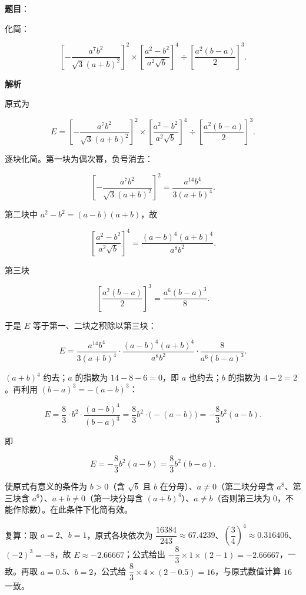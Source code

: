 \begin{answer}

\textbf{题目}：

化简：

\nopagebreak[4]
\[
\left[-\frac{a^7b^2}{\sqrt{3}(a+b)^2}\right]^2\times\left[\frac{a^2-b^2}{a^2\sqrt{b}}\right]^4\div\left[\frac{a^2(b-a)}{2}\right]^3.
\]

\textbf{解析}

原式为

\nopagebreak[4]
\[
E=\left[-\frac{a^7b^2}{\sqrt3(a+b)^2}\right]^2\times\left[\frac{a^2-b^2}{a^2\sqrt b}\right]^4\div\left[\frac{a^2(b-a)}{2}\right]^3.
\]

逐块化简。第一块为偶次幂，负号消去：

\nopagebreak[4]
\[
\left[-\frac{a^7b^2}{\sqrt3(a+b)^2}\right]^2=\frac{a^{14}b^4}{3(a+b)^4}.
\]

第二块中 $a^2-b^2=(a-b)(a+b)$，故

\nopagebreak[4]
\[
\left[\frac{a^2-b^2}{a^2\sqrt b}\right]^4
=\frac{(a-b)^4(a+b)^4}{a^8b^2}.
\]

第三块

\nopagebreak[4]
\[
\left[\frac{a^2(b-a)}{2}\right]^3=\frac{a^6(b-a)^3}{8}.
\]

于是 $E$ 等于第一、二块之积除以第三块：

\nopagebreak[4]
\[
E=\frac{a^{14}b^4}{3(a+b)^4}\cdot\frac{(a-b)^4(a+b)^4}{a^8b^2}\cdot\frac{8}{a^6(b-a)^3}.
\]

$(a+b)^4$ 约去；$a$ 的指数为 $14-8-6=0$，即 $a$ 也约去；$b$ 的指数为 $4-2=2$。再利用 $(b-a)^3=-(a-b)^3$：

\nopagebreak[4]
\[
E=\frac83\cdot b^2\cdot\frac{(a-b)^4}{(b-a)^3}
=\frac83b^2\cdot\bigl(-(a-b)\bigr)
=-\frac83b^2(a-b).
\]

即

\nopagebreak[4]
\[
E=-\frac83b^2(a-b)=\frac83b^2(b-a).
\]

使原式有意义的条件为 $b>0$（含 $\sqrt b$ 且 $b$ 在分母）、$a\ne0$（第二块分母含 $a^8$、第三块含 $a^6$）、$a+b\ne0$（第一块分母含 $(a+b)^4$）、$a\ne b$（否则第三块为 $0$，不能作除数）。在此条件下化简有效。

复算：取 $a=2$、$b=1$，原式各块依次为 $\dfrac{16384}{243}\approx67.4239$、$\left(\dfrac34\right)^4\approx0.316406$、$(-2)^3=-8$，故 $E\approx-2.66667$；公式给出 $-\dfrac83\times1\times(2-1)=-2.66667$，一致。再取 $a=0.5$、$b=2$，公式给 $\dfrac83\times4\times(2-0.5)=16$，与原式数值计算 $16$ 一致。


\end{answer}

